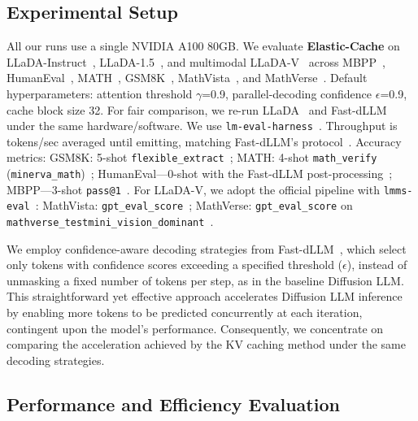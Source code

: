 \documentclass{article} %
\theoremstyle{definition}
\theoremstyle{remark}
\begin{document}
\subsection{Experimental Setup}
\vspace{-0.05in}
All our runs use a single NVIDIA A100 80GB. We evaluate \textbf{Elastic-Cache} on LLaDA-Instruct~\citep{nie2025large}, LLaDA-1.5~\citep{zhu2025llada15variancereducedpreference}, and multimodal LLaDA-V~\citep{you2025llada} across MBPP~\citep{austin2021program}, HumanEval~\citep{chen2021evaluating}, MATH~\citep{hendrycks2021measuring}, GSM8K~\citep{cobbe2021training}, MathVista~\citep{lu2023mathvista}, and MathVerse~\citep{zhang2024mathverse}. Default hyperparameters: attention threshold $\gamma$=0.9, parallel-decoding confidence $\epsilon$=0.9, cache block size 32. For fair comparison, we re-run LLaDA~\citep{nie2025large} and Fast-dLLM~\citep{wu2025fast} under the same hardware/software.
We use \texttt{lm-eval-harness}~\citep{eval-harness}. Throughput is tokens/sec averaged until emitting, matching Fast-dLLM's protocol~\citep{wu2025fast}. 
Accuracy metrics: GSM8K: 5-shot \texttt{flexible\_extract}~\citep{cobbe2021training}; MATH: 4-shot \texttt{math\_verify} (\texttt{minerva\_math})~\citep{hendrycks2021measuring}; HumanEval—0-shot with the Fast-dLLM post-processing~\citep{chen2021evaluating,wu2025fast}; MBPP—3-shot \texttt{pass@1}~\citep{austin2021program}. 
For LLaDA-V, we adopt the official pipeline with \texttt{lmms-eval}~\citep{zhang2024lmmsevalrealitycheckevaluation,lmms_eval2024}: MathVista: \texttt{gpt\_eval\_score}~\citep{lu2023mathvista}; MathVerse: \texttt{gpt\_eval\_score} on \texttt{mathverse\_testmini\_vision\_dominant}~\citep{zhang2024mathverse}.

 We employ confidence-aware decoding strategies from Fast-dLLM~\citep{wu2025fast}, which select only tokens with confidence scores exceeding a specified threshold ($\epsilon$), instead of unmasking a fixed number of tokens per step, as in the baseline Diffusion LLM. This straightforward yet effective approach accelerates Diffusion LLM inference by enabling more tokens to be predicted concurrently at each iteration, contingent upon the model’s performance. Consequently, we concentrate on comparing the acceleration achieved by the KV caching method under the same decoding strategies.

\vspace{-0.05in}
\subsection{Performance and Efficiency Evaluation}
\end{document}
